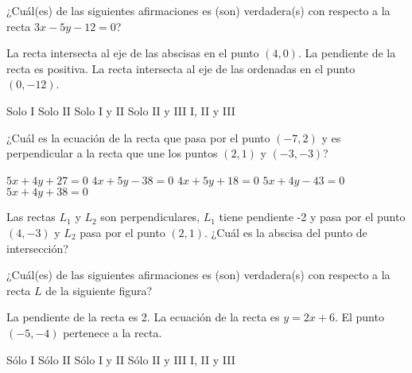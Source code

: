 \documentclass[sin nombre]{srs2}
\begin{document}
\begin{preguntas}
\pregunta ¿Cuál(es) de las siguientes afirmaciones es (son) verdadera(s) con respecto a la recta $3x - 5y - 12 = 0$?
\begin{opciones}
\opcion La recta intersecta al eje de las abscisas en el punto $\left(4, 0\right)$.
\opcion La pendiente de la recta es positiva.
\opcion La recta intersecta al eje de las ordenadas en el punto $\left(0, -12\right)$.
\end{opciones}
\begin{alternativas}
\alternativa Solo I
\alternativa Solo II
\alternativa Solo I y II
\alternativa Solo II y III
\alternativa I, II y III
\end{alternativas}

\pregunta ¿Cuál es la ecuación de la recta que pasa por el punto $\left(-7, 2\right)$ y es perpendicular a la recta que une los puntos $\left(2,1\right)$ y $\left(-3,-3\right)$?
\begin{alternativas}
\alternativa $5x + 4y + 27 = 0$
\alternativa $4x + 5y - 38 = 0$
\alternativa $4x + 5y + 18 = 0$
\alternativa $5x + 4y - 43 = 0$
\alternativa $5x + 4y + 38 = 0$
\end{alternativas}

\pregunta Las rectas $L_1$ y $L_2$ son perpendiculares, $L_1$ tiene pendiente -2 y pasa por el punto $\left(4, -3\right)$ y $L_2$ pasa por el punto $\left(2,1\right)$. ¿Cuál es la abscisa del punto de intersección?
\begin{alternativas}
\end{alternativas}

\pregunta ¿Cuál(es) de las siguientes afirmaciones es (son) verdadera(s) con respecto a la recta $L$ de la siguiente figura?
\begin{columnas}[0.65]
\begin{opciones}
\opcion La pendiente de la recta es 2.
\opcion La ecuación de la recta es $y = 2x + 6$.
\opcion El punto $\left(-5, -4\right)$ pertenece a la recta.
\end{opciones}
\begin{alternativas}
\alternativa Sólo I
\alternativa Sólo II
\alternativa Sólo I y II
\alternativa Sólo II y III
\alternativa I, II y III
\end{alternativas}
\siguiente
{}
\end{columnas}



\end{preguntas}
\end{document}
